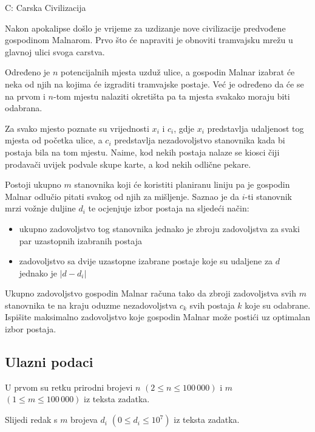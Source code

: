 \begin{statement}[
  timelimit=1 s,
  memorylimit=512 MiB,
]{C: Carska Civilizacija}

Nakon apokalipse došlo je vrijeme za uzdizanje nove civilizacije predvođene
gospodinom Malnarom. Prvo što će napraviti je obnoviti tramvajsku mrežu u
glavnoj ulici svoga carstva.

Određeno je $n$ potencijalnih mjesta uzduž ulice, a gospodin Malnar izabrat će
neka od njih na kojima će izgraditi tramvajske postaje. Već je određeno da će
se na prvom i $n$-tom mjestu nalaziti okretišta pa ta mjesta svakako moraju
biti odabrana.

Za svako mjesto poznate su vrijednosti $x_i$ i $c_i$, gdje $x_i$ predstavlja
udaljenost tog mjesta od početka ulice, a $c_i$ predstavlja nezadovoljstvo
stanovnika kada bi postaja bila na tom mjestu. Naime, kod nekih postaja
nalaze se kiosci čiji prodavači uvijek podvale skupe karte, a kod nekih
odlične pekare.

Postoji ukupno $m$ stanovnika koji će koristiti planiranu liniju pa je gospodin
Malnar odlučio pitati svakog od njih za mišljenje. Saznao je da $i$-ti
stanovnik mrzi vožnje duljine $d_i$ te ocjenjuje izbor postaja na sljedeći
način:

\begin{itemize}
    \item ukupno zadovoljstvo tog stanovnika jednako je zbroju zadovoljstva za
          svaki par uzastopnih izabranih postaja
    \item zadovoljstvo sa dvije uzastopne izabrane postaje koje su udaljene za
          $d$ jednako je $|d - d_i|$
\end{itemize}

Ukupno zadovoljstvo gospodin Malnar računa tako da zbroji zadovoljstva svih $m$
stanovnika te na kraju oduzme nezadovoljstva $c_k$ svih postaja $k$ koje su
odabrane. Ispišite maksimalno zadovoljstvo koje gospodin Malnar može postići
uz optimalan izbor postaja.

\subsection*{Ulazni podaci}
 U prvom su retku prirodni brojevi $n$ $(2 \le n \le 100\,000)$ i $m$
$(1 \le m \le 100\,000)$ iz teksta zadatka.

Slijedi redak s $m$ brojeva $d_i$ $(0 \le d_i \le 10^7)$ iz teksta zadatka.


\end{statement}
